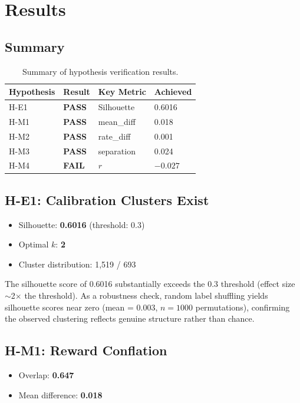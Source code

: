\section{Results}

\subsection{Summary}

\begin{table}[h]
\centering
\begin{tabular}{@{}llll@{}}
\toprule
Hypothesis & Result & Key Metric & Achieved \\
\midrule
H-E1 & \textbf{PASS} & Silhouette & 0.6016 \\
H-M1 & \textbf{PASS} & mean\_diff & 0.018 \\
H-M2 & \textbf{PASS} & rate\_diff & 0.001 \\
H-M3 & \textbf{PASS} & separation & 0.024 \\
H-M4 & \textbf{FAIL} & $r$ & $-0.027$ \\
\bottomrule
\end{tabular}
\caption{Summary of hypothesis verification results.}
\label{tab:results}
\end{table}

\subsection{H-E1: Calibration Clusters Exist}

\begin{itemize}
    \item Silhouette: \textbf{0.6016} (threshold: 0.3)
    \item Optimal $k$: \textbf{2}
    \item Cluster distribution: 1,519 / 693
\end{itemize}

The silhouette score of 0.6016 substantially exceeds the 0.3 threshold (effect size $\sim$2$\times$ the threshold). As a robustness check, random label shuffling yields silhouette scores near zero (mean = 0.003, $n = 1000$ permutations), confirming the observed clustering reflects genuine structure rather than chance.

\subsection{H-M1: Reward Conflation}

\begin{itemize}
    \item Overlap: \textbf{0.647}
    \item Mean difference: \textbf{0.018}
\end{itemize}

